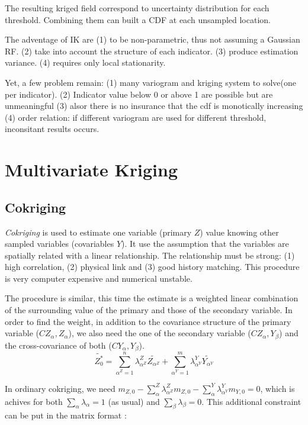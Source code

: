 \documentclass[twocolumn]{article}
\numberwithin{equation}{section}
\begin{document}
The resulting kriged field correspond to uncertainty distribution for each threshold. Combining them can built a CDF at each unsampled location. 

The adventage of IK are (1) to be non-parametric, thus not assuming a Gaussian RF. (2) take into account the structure of each indicator. (3) produce estimation variance. (4) requires only local stationarity.

Yet, a few problem remain: (1) many variogram and kriging system to solve(one per indicator). (2) Indicator value below 0 or above 1 are possible but are unmeaningful (3) alsor there is no insurance that the cdf is monotically increasing (4) order relation: if different variogram are used for different threshold, inconsitant results occurs.
	


\section{Multivariate Kriging}
\subsection{Cokriging}
\emph{Cokriging} is used to estimate one variable (primary $Z$) value knowing other sampled variables (covariables $Y$). It use the assumption that the variables are spatially related with a linear relationship. The relationship must be strong: (1) high correlation, (2) physical link and (3) good history matching. This procedure is very computer expensive and numerical unstable.


The procedure is similar, this time the estimate is a weighted linear combination of the surrounding value of the primary and those of the secondary variable. In order to find the weight, in addition to the covariance structure of the primary variable ($C{Z_\alpha,Z_\alpha}$), we also need the one of the secondary variable ($C{Z_\alpha,Y_\beta}$) and the cross-covariance of both ($C{Y_\alpha,Y_\beta}$).
\begin{equation} \label{eq:cokrig}
	\tilde{Z^*_0} = \sum_{\alpha^Z=1}^n \lambda_{\alpha^Z}^Z \tilde{Z_{\alpha^Z}} + \sum_{\alpha^Y=1}^m \lambda_{\alpha^Y}^Y \tilde{Y_{\alpha^Y}} 
\end{equation}

In ordinary cokriging, we need $m_{Z,0} -\sum_\alpha^Z \lambda_{\alpha^Z}^Z m_{Z,0} - \sum_\alpha^Y \lambda_{\alpha^Y}^Y m_{Y,0} = 0$, which is achives for both $\sum_\alpha \lambda_\alpha = 1$ (as usual) and $\sum_\beta \lambda_\beta = 0$. This additional constraint can be put in the matrix format :
\end{document}
